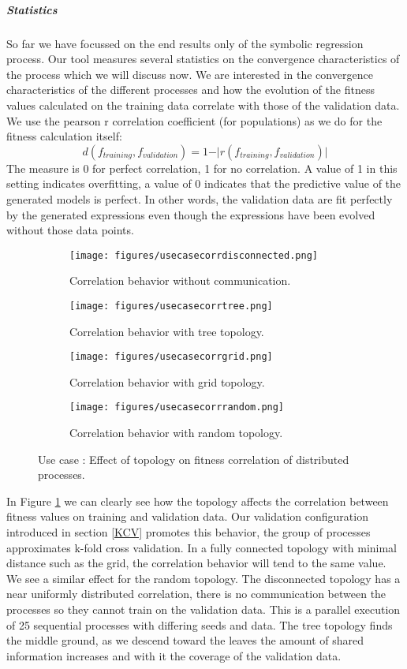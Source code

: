 \subparagraph{Statistics}
So far we have focussed on the end results only of the symbolic regression process. Our tool measures several statistics on the convergence characteristics of the process which we will discuss now.
We are interested in the convergence characteristics of the different processes and how the evolution of the fitness values calculated on the training data correlate with those of the validation data.
We use the pearson r correlation coefficient (for populations) as we do for the fitness calculation itself:
\[
d(f_{training}, f_{validation}) = 1 - \vert r(f_{training}, f_{validation}) \vert
\]
The measure is 0 for perfect correlation, 1 for no correlation. A value of 1 in this setting indicates overfitting, a value of 0 indicates that the predictive value of the generated models is perfect. In other words, the validation data are fit perfectly by the generated expressions even though the expressions have been evolved without those data points.
\begin{figure}
    \begin{subfigure}{0.5\textwidth}
        \texttt{[image: figures/usecasecorrdisconnected.png]}
        \caption{Correlation behavior without communication.}
    \end{subfigure}
    \begin{subfigure}{0.5\textwidth}
        \texttt{[image: figures/usecasecorrtree.png]}
        \caption{Correlation behavior with tree topology.}
    \end{subfigure}
        \begin{subfigure}{0.5\textwidth}
        \texttt{[image: figures/usecasecorrgrid.png]}
        \caption{Correlation behavior with grid topology.}
    \end{subfigure}
    \begin{subfigure}{0.5\textwidth}
        \texttt{[image: figures/usecasecorrrandom.png]}
        \caption{Correlation behavior with random topology.}
    \end{subfigure}
    \caption{Use case : Effect of topology on fitness correlation of distributed processes.}
    \label{fig:usecasecorrelation}
\end{figure}
In Figure \ref{fig:usecasecorrelation} we can clearly see how the topology affects the correlation between fitness values on training and validation data. Our validation configuration introduced in section \ref{KCV} promotes this behavior, the group of processes approximates k-fold cross validation. In a fully connected topology with minimal distance such as the grid, the correlation behavior will tend to the same value. We see a similar effect for the random topology. The disconnected topology has  a near uniformly distributed correlation, there is no communication between the processes so they cannot train on the validation data. This is a parallel execution of 25 sequential processes with differing seeds and data. The tree topology finds the middle ground, as we descend toward the leaves the amount of shared information increases and with it the coverage of the validation data.
